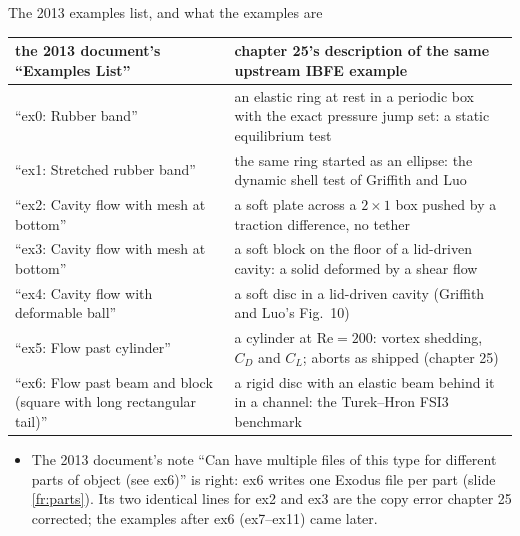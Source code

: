 \documentclass[aspectratio=169,11pt]{beamer}
\begin{document}
\begin{frame}{The 2013 examples list, and what the examples are}
\label{fr:list2013}
\scriptsize
\begin{tabular}{@{}L{0.33\textwidth}L{0.6\textwidth}@{}}
\toprule
the 2013 document's ``Examples List'' & chapter 25's description of the same upstream IBFE example \\
\midrule
``ex0: Rubber band'' & an elastic ring at rest in a periodic box with the exact pressure jump set: a static equilibrium test \\
``ex1: Stretched rubber band'' & the same ring started as an ellipse: the dynamic shell test of Griffith and Luo \\
``ex2: Cavity flow with mesh at bottom'' & a soft plate across a $2\times1$ box pushed by a traction difference, no tether \\
``ex3: Cavity flow with mesh at bottom'' & a soft block on the floor of a lid-driven cavity: a solid deformed by a shear flow \\
``ex4: Cavity flow with deformable ball'' & a soft disc in a lid-driven cavity (Griffith and Luo's Fig.\ 10) \\
``ex5: Flow past cylinder'' & a cylinder at $\mathrm{Re} = 200$: vortex shedding, $C_D$ and $C_L$; aborts as shipped (chapter 25) \\
``ex6: Flow past beam and block (square with long rectangular tail)'' & a rigid disc with an elastic beam behind it in a channel: the Turek--Hron FSI3 benchmark \\
\bottomrule
\end{tabular}

\begin{itemize}
  \item The 2013 document's note ``Can have multiple files of this type for different parts of object (see ex6)'' is right: ex6 writes one Exodus file per part (slide \ref{fr:parts}). Its two identical lines for ex2 and ex3 are the copy error chapter 25 corrected; the examples after ex6 (ex7--ex11) came later.
\end{itemize}
\end{frame}
\end{document}
